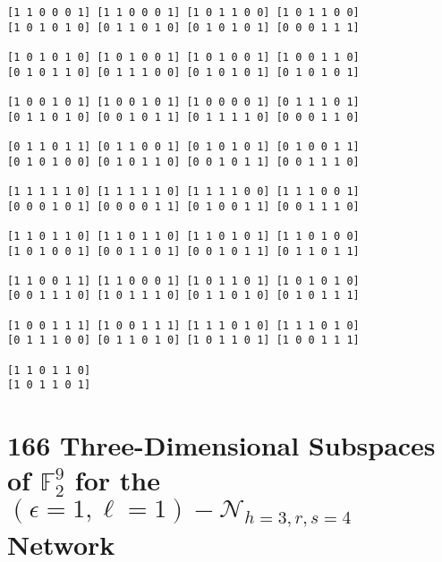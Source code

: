 \begin{lstlisting}
[1 1 0 0 0 1] [1 1 0 0 0 1] [1 0 1 1 0 0] [1 0 1 1 0 0] 
[1 0 1 0 1 0] [0 1 1 0 1 0] [0 1 0 1 0 1] [0 0 0 1 1 1] 

[1 0 1 0 1 0] [1 0 1 0 0 1] [1 0 1 0 0 1] [1 0 0 1 1 0] 
[0 1 0 1 1 0] [0 1 1 1 0 0] [0 1 0 1 0 1] [0 1 0 1 0 1] 

[1 0 0 1 0 1] [1 0 0 1 0 1] [1 0 0 0 0 1] [0 1 1 1 0 1] 
[0 1 1 0 1 0] [0 0 1 0 1 1] [0 1 1 1 1 0] [0 0 0 1 1 0] 

[0 1 1 0 1 1] [0 1 1 0 0 1] [0 1 0 1 0 1] [0 1 0 0 1 1] 
[0 1 0 1 0 0] [0 1 0 1 1 0] [0 0 1 0 1 1] [0 0 1 1 1 0] 

[1 1 1 1 1 0] [1 1 1 1 1 0] [1 1 1 1 0 0] [1 1 1 0 0 1] 
[0 0 0 1 0 1] [0 0 0 0 1 1] [0 1 0 0 1 1] [0 0 1 1 1 0] 

[1 1 0 1 1 0] [1 1 0 1 1 0] [1 1 0 1 0 1] [1 1 0 1 0 0] 
[1 0 1 0 0 1] [0 0 1 1 0 1] [0 0 1 0 1 1] [0 1 1 0 1 1] 

[1 1 0 0 1 1] [1 1 0 0 0 1] [1 0 1 1 0 1] [1 0 1 0 1 0] 
[0 0 1 1 1 0] [1 0 1 1 1 0] [0 1 1 0 1 0] [0 1 0 1 1 1] 

[1 0 0 1 1 1] [1 0 0 1 1 1] [1 1 1 0 1 0] [1 1 1 0 1 0] 
[0 1 1 1 0 0] [0 1 1 0 1 0] [1 0 1 1 0 1] [1 0 0 1 1 1] 

[1 1 0 1 1 0] 
[1 0 1 1 0 1]
\end{lstlisting}


\section{166 Three-Dimensional Subspaces of $\ensuremath{\mathbb{F}}_{2}^{9}$
for the $\left(\epsilon=1,\ell=1\right)-\mathcal{N}_{h=3,r,s=4}$
Network \label{sec:166-Three-Dimensional-Subspaces}}

